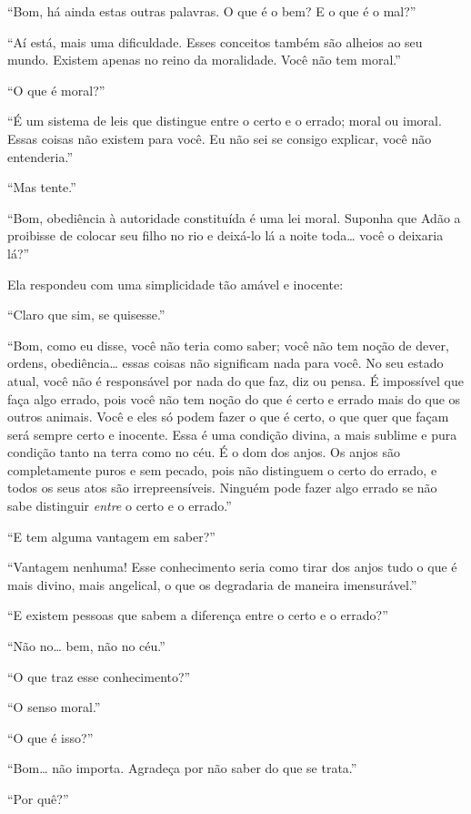 ``Bom, há ainda estas outras palavras. O que é o bem? E o que
é o mal?''

``Aí está, mais uma dificuldade. Esses conceitos também são alheios ao
seu mundo. Existem apenas no reino da
moralidade. Você não tem moral.''

``O que é moral?''

``É um sistema de leis que distingue entre o certo e o errado;
moral ou imoral. Essas coisas não existem para você. Eu não sei se consigo
explicar, você não entenderia.''

``Mas tente.''

``Bom, obediência à autoridade constituída é uma lei moral.
Suponha que Adão a proibisse de colocar seu filho no rio e deixá-lo lá a
noite toda\ldots{} você o deixaria lá?''

Ela respondeu com uma simplicidade tão amável e
inocente:

``Claro que sim, se quisesse.''

``Bom, como eu disse, você não teria como saber; você não tem
noção de dever, ordens, obediência\ldots{} essas coisas não significam nada para você. No
seu estado atual, você não é responsável por nada do que faz, diz ou
pensa. É impossível que faça algo errado, pois você não tem noção
do que é certo e errado mais do que os outros animais. Você e eles só podem
fazer o que é certo, o que quer que façam será sempre
certo e inocente. Essa é uma condição divina, a mais sublime e pura
condição tanto na terra como no céu. É o dom dos anjos. Os anjos são
completamente puros e sem pecado, pois não distinguem o certo do errado, e
todos os seus atos são irrepreensíveis. Ninguém pode fazer algo errado se
não sabe distinguir \textit{entre} o certo e o errado.''

``E tem alguma vantagem em saber?''

``Vantagem nenhuma! Esse conhecimento seria como tirar dos
anjos tudo o que é mais divino, mais angelical, o que os degradaria de
maneira imensurável.''

``E existem pessoas que sabem a diferença entre o certo e o
errado?''

``Não no\ldots{} bem, não no céu.''

``O que traz esse conhecimento?''

``O senso moral.''

``O que é isso?''

``Bom\ldots{} não importa. Agradeça por não
saber do que se trata.''

``Por quê?''

